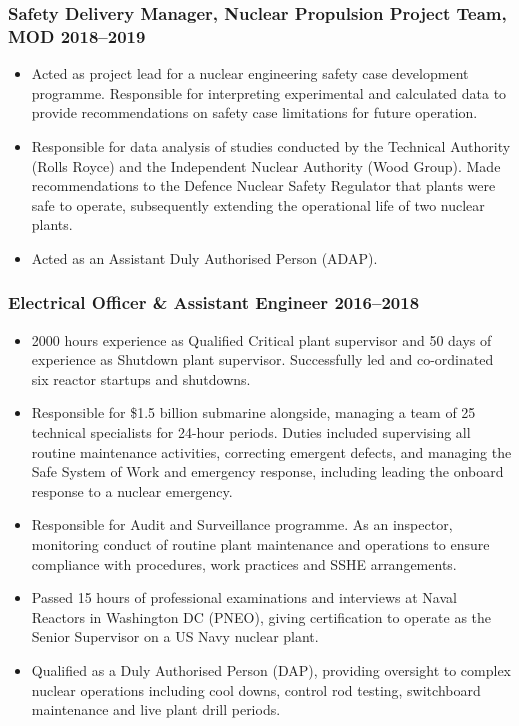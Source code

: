 \documentclass[a4paper, oneside, final, 11pt]{scrartcl} %
\begin{document}
\smallskip 

\subsubsection*{Safety Delivery Manager,  Nuclear Propulsion Project Team, MOD \hfill 2018--2019}  
\normalfont
\begin{itemize}

\item Acted as project lead for a nuclear engineering safety case development programme.  Responsible for interpreting experimental and calculated data to provide recommendations on safety case limitations for future operation.

\item Responsible for data analysis of studies conducted by the Technical Authority (Rolls Royce) and the Independent Nuclear Authority (Wood Group). Made recommendations to the Defence Nuclear Safety Regulator that plants were safe to operate,  subsequently extending the operational life of two nuclear plants.

\item Acted as an Assistant Duly Authorised Person (ADAP). 

\end{itemize}


				
\subsubsection*{Electrical Officer \& Assistant Engineer \hfill 2016--2018}  
\normalfont
\begin{itemize}

	 
	\item 2000 hours experience as Qualified Critical plant supervisor and 50 days of experience as Shutdown plant supervisor. Successfully led and co-ordinated six reactor startups and shutdowns.
	
\item  Responsible for \$1.5 billion submarine alongside, managing a team of 25 technical specialists for 24-hour periods. Duties included supervising all routine maintenance activities, correcting emergent defects, and managing the Safe System of Work and emergency response, including leading the onboard response to a nuclear emergency.  
\item Responsible for Audit and Surveillance programme. As an inspector, monitoring conduct of routine plant maintenance and operations to ensure compliance with procedures, work practices and SSHE arrangements. 

\item Passed 15 hours of professional examinations and interviews at Naval Reactors in Washington DC (PNEO), giving certification to operate as the Senior Supervisor on a US Navy nuclear plant. 

\item Qualified as a Duly Authorised Person (DAP), providing oversight to complex nuclear operations including cool downs, control rod testing, switchboard maintenance and live plant drill periods.
\end{itemize}
\end{document}
